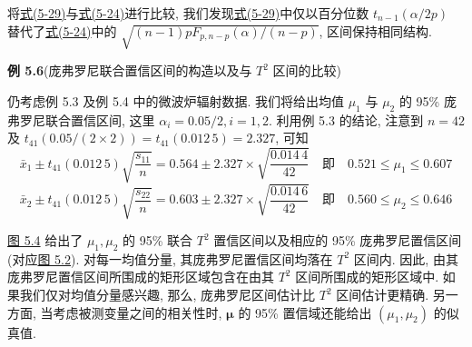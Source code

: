 将\hyperref[eq:5-29]{式(5-29)}与\hyperref[eq:5-24]{式(5-24)}进行比较, 我们发现\hyperref[eq:5-29]{式(5-29)}中仅以百分位数 $t_{n-1}(\alpha/2p)$ 替代了\hyperref[eq:5-24]{式(5-24)}中的 $\sqrt{(n-1)pF_{p,n-p}(\alpha)/(n-p)}$, 区间保持相同结构.

\medskip
\noindent\textbf{例 5.6}\quad (庞弗罗尼联合置信区间的构造以及与 $T^{2}$ 区间的比较)

仍考虑例 5.3 及例 5.4 中的微波炉辐射数据. 我们将给出均值 $\mu_{1}$ 与 $\mu_{2}$ 的 95\% 庞弗罗尼联合置信区间, 这里 $\alpha_{i}=0.05/2, i=1,2$. 利用例 5.3 的结论, 注意到 $n=42$ 及 $t_{41}(0.05/(2\times2))=t_{41}(0.012\,5)=2.327$, 可知
\[
\bar{x}_{1}\pm t_{41}(0.012\,5)\sqrt{\frac{s_{11}}{n}}=0.564\pm2.327\times\sqrt{\frac{0.014\,4}{42}} \quad\text{即}\quad 0.521\le \mu_{1}\le 0.607
\]
\[
\bar{x}_{2}\pm t_{41}(0.012\,5)\sqrt{\frac{s_{22}}{n}}=0.603\pm2.327\times\sqrt{\frac{0.014\,6}{42}} \quad\text{即}\quad 0.560\le \mu_{2}\le 0.646
\]

\hyperref[fig:5.4]{图 5.4} 给出了 $\mu_{1},\mu_{2}$ 的 95\% 联合 $T^{2}$ 置信区间以及相应的 95\% 庞弗罗尼置信区间(对应\hyperref[fig:5.2]{图 5.2}). 对每一均值分量, 其庞弗罗尼置信区间均落在 $T^{2}$ 区间内. 因此, 由其庞弗罗尼置信区间所围成的矩形区域包含在由其 $T^{2}$ 区间所围成的矩形区域中. 如果我们仅对均值分量感兴趣, 那么, 庞弗罗尼区间估计比 $T^{2}$ 区间估计更精确. 另一方面, 当考虑被测变量之间的相关性时, $\boldsymbol{\mu}$ 的 95\% 置信域还能给出 $(\mu_{1},\mu_{2})$ 的似真值.
